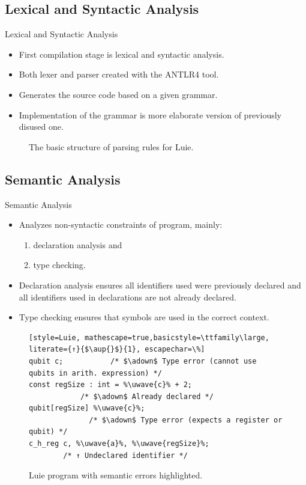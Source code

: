 \subsection{Lexical and Syntactic Analysis}
\begin{frame}{Lexical and Syntactic Analysis}
    \begin{itemize}
        \item First compilation stage is lexical and syntactic analysis.
        \item Both lexer and parser created with the ANTLR4 tool.
        \item Generates the source code based on a given grammar. 
        \item Implementation of the grammar is more elaborate version of previously disused one.
    \end{itemize}
    \begin{figure}[h]
        \centering
        
        \caption{The basic structure of parsing rules for Luie.}
    \end{figure}
\end{frame}

\subsection{Semantic Analysis}
\begin{frame}[fragile]{Semantic Analysis}
    \begin{itemize}
        \item Analyzes non-syntactic constraints of program, mainly:
        \begin{enumerate}
            \item declaration analysis and
            \item type checking.
        \end{enumerate}
        \item Declaration analysis ensures all identifiers used were previously declared and all identifiers used in declarations are not already declared.
        \item Type checking ensures that symbols are used in the correct context.
    \end{itemize}
    \vfill
    \begin{figure}[htp]
        \centering     
        \begin{lstlisting}[style=Luie, mathescape=true,basicstyle=\ttfamily\large, literate={↑}{$\aup{}$}{1}, escapechar=\%] 
qubit c;           /* $\adown$ Type error (cannot use qubits in arith. expression) */       
const regSize : int = %\uwave{c}% + 2; 
            /* $\adown$ Already declared */      
qubit[regSize] %\uwave{c}%;
              /* $\adown$ Type error (expects a register or qubit) */                      
c_h_reg c, %\uwave{a}%, %\uwave{regSize}%;
        /* ↑ Undeclared identifier */                 
        \end{lstlisting}
        \caption{Luie program with semantic errors highlighted.}
    \end{figure}
\end{frame}

